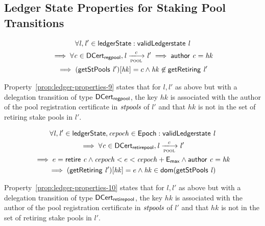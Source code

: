 \subsection{Ledger State Properties for Staking Pool Transitions}
\label{sec:ledg-state-prop}

\begin{property}
  \begin{multline*}
    \forall \var{l}, \var{l'} \in \ledgerState: \applyFun{validLedgerstate}{l}\\
    \implies \forall \var{c} \in \DCertRegPool, \var{l} \trans{pool}{c} \var{l'}
    \implies \applyFun{author}{c} = \var{hk}\\ \implies
    (\applyFun{getStPools}{l'})[\var{hk}] = c \wedge \var{hk} \not\in
    \applyFun{getRetiring}{l'}
  \end{multline*}
  \label{prop:ledger-properties-9}
\end{property}

Property~\ref{prop:ledger-properties-9} states that for $l, l'$ as above but
with a delegation transition of type $\mathsf{DCert_{regpool}}$, the key $hk$ is associated
with the author of the pool registration certificate in $\mathit{stpools}$ of $l'$
and that $hk$ is not in the set of retiring stake pools in $l'$.

\begin{property}
  \begin{multline*}
    \forall \var{l}, \var{l'} \in \ledgerState, \var{cepoch} \in \Epoch:
    \applyFun{validLedgerstate}{l} \\
    \implies \forall \var{c} \in \DCertRetirePool, \var{l} \trans{pool}{c} \var{l'}
    \\ \implies e = \applyFun{retire}{c} \wedge
    \var{cepoch} < e < \var{cepoch} + \emax \wedge \applyFun{author}{c} =
    \var{hk}\\ \implies (\applyFun{getRetiring}{l'})[\var{hk}] = e \wedge
    \var{hk} \in \fun{dom}(\applyFun{getStPools}{l})
  \end{multline*}
  \label{prop:ledger-properties-10}
\end{property}

Property~\ref{prop:ledger-properties-10} states that for $l, l'$ as above but
with a delegation transition of type $\mathsf{DCert_{retirepool}}$, the key $hk$ is
associated with the author of the pool registration certificate in
$\mathit{stpools}$ of $l'$ and that $hk$ is not in the set of retiring stake pools
in $l'$.

